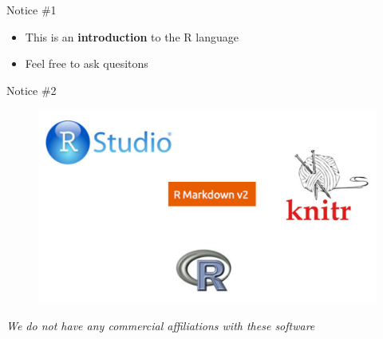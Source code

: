 \documentclass[11pt]{beamer}\usepackage[]{graphicx}\usepackage[]{color}
\begin{document}
\begin{frame}{Notice \#1}
\begin{itemize}
\item This is an \textbf{introduction} to the R language
\pause \item Feel free to ask quesitons
\end{itemize}
\end{frame}

\begin{frame}{Notice \#2}
\begin{figure}
\includegraphics[width=1.0\columnwidth]{affiliation.PNG}\\[5mm]
\end{figure}

\textit{We do not have any commercial affiliations with these software}

\end{frame}

\end{document}
